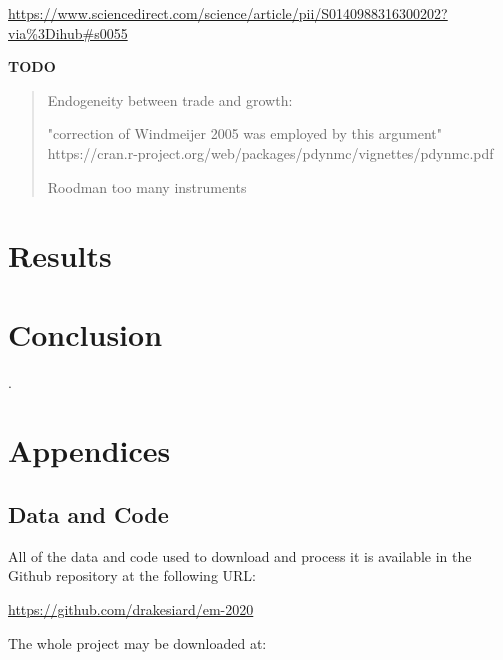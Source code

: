 \documentclass[12pt,a4paper]{article}
\begin{document}
\urldef{\rafiqdata}\url{https://www.sciencedirect.com/science/article/pii/S0140988316300202?via%3Dihub#s0055}

\noindent\textbf{TODO}
\begin{quote}
Endogeneity between trade and growth: \cite{rodriguezTradePolicyEconomic2001}

"correction of Windmeijer 2005 was employed by this argument" https://cran.r-project.org/web/packages/pdynmc/vignettes/pdynmc.pdf

Roodman too many instruments
\end{quote}




\section{Results}\label{sec:results}

\section{Conclusion}\label{sec:conclusion}

\clearpage

\appendix

\renewcommand{\refname}{\section{References}\label{sec:references}}.


\clearpage

\section{Appendices}

\subsection{Data and Code}\label{sec:data_and_code}

All of the data and code used to download and process it is available in the Github repository at the following URL:

\url{https://github.com/drakesiard/em-2020}

\noindent
The whole project may be downloaded at:
\end{document}
